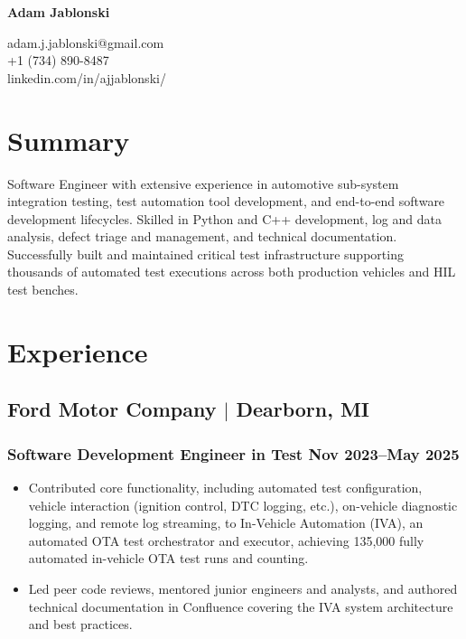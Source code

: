 \documentclass[11pt]{article} %
\begin{document}
\begin{center}
	\begin{minipage}{0.45\textwidth}
		{\Huge\bfseries
			Adam Jablonski %
		} \\ \medskip
	\end{minipage} \hfill
	\begin{minipage}{0.5\textwidth}
		\raggedleft
		adam.j.jablonski@gmail.com\\
		+1 (734) 890-8487\\
		linkedin.com/in/ajjablonski/
	\end{minipage}
\end{center}

\section{Summary}
Software Engineer with extensive experience in automotive sub-system integration testing, 
test automation tool development, and end-to-end software development lifecycles. Skilled in 
Python and C++ development, log and data analysis, defect triage and management, and technical 
documentation. Successfully built and maintained critical test infrastructure supporting 
thousands of automated test executions across both production vehicles and HIL test benches.

\section{Experience}
\subsection{Ford Motor Company $|$ {\normalfont Dearborn, MI}}
\subsubsection{Software Development Engineer in Test \hfill  Nov 2023--May 2025}
\begin{itemize}
	\item Contributed core functionality, including automated test configuration, 
	vehicle interaction (ignition control, DTC logging, etc.), on-vehicle diagnostic logging, 
	and remote log streaming, to In-Vehicle Automation (IVA), an automated OTA test orchestrator 
	and executor, achieving 135,000 fully automated in-vehicle OTA test runs and counting.
	\item Led peer code reviews, mentored junior engineers and analysts, and authored technical 
	documentation in Confluence covering the IVA system architecture and best practices.
\end{itemize}
\end{document}
